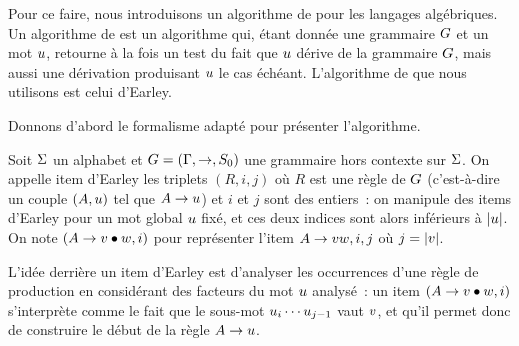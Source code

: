 Pour ce faire, nous introduisons un algorithme de  pour les
langages algébriques. Un algorithme de  est un algorithme
qui, étant donnée une grammaire $G$ et un mot $u$, retourne à la fois
un test du fait que $u$ dérive de la grammaire $G$, mais aussi une
dérivation produisant $u$ le cas échéant. L'algorithme de
 que nous utilisons est celui d'Earley.

\noindent
Donnons d'abord le formalisme adapté pour présenter l'algorithme.

\begin{definition}
  Soit $\Sigma$ un alphabet et $G = (\Gamma, \to, S_{0})$ une grammaire hors
  contexte sur $\Sigma$. On appelle item d'Earley les triplets $(R,i,j)$ où $R$
  est une règle de $G$ (c'est-à-dire un couple $(A, u)$ tel que
  $A \to u$) et $i$ et $j$ sont des entiers~: on manipule des items
  d'Earley pour un mot global $u$ fixé, et ces deux indices sont alors
  inférieurs à $\left|u\right|$.
  On note $(A\to v\bullet w,i)$ pour représenter l'item $A \to vw , i,j$ où
  $j = \left|v\right|$.
\end{definition}

L'idée derrière un item d'Earley est d'analyser les occurrences d'une règle
de production en considérant des facteurs du mot $u$ analysé~: un item
$(A\to v\bullet w,i)$ s'interprète comme le fait que le sous-mot
$u_i\cdots u_{j-1}$ vaut $v$, et qu'il permet donc de construire
le début de la règle $A \to u$.

